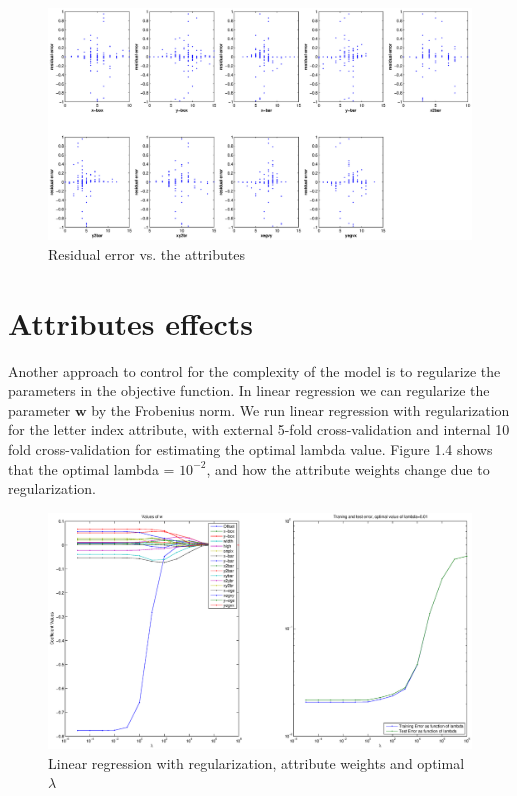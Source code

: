 \begin{figure}[htbp]
\center
\includegraphics[width = 1.1\textwidth]{figure_p2/r3.eps}
\caption{Residual error vs. the attributes}
\end{figure}

\section*{Attributes effects}
Another approach to control for the complexity of the model is to regularize the parameters in the objective function. In linear regression we can regularize the parameter $\textbf{w}$ by the Frobenius norm. 
We run linear regression with regularization for the letter index attribute, with external 5-fold cross-validation and internal 10 fold cross-validation for estimating the optimal lambda value. Figure 1.4 shows that the optimal lambda = $10^{-2}$, and how the attribute weights change due to regularization.

\begin{figure}[htbp]
\center
\includegraphics[width = 1.25\textwidth]{figure_p2/r5.eps}
\caption{Linear regression with regularization,  attribute weights and optimal $\lambda$}
\end{figure}

